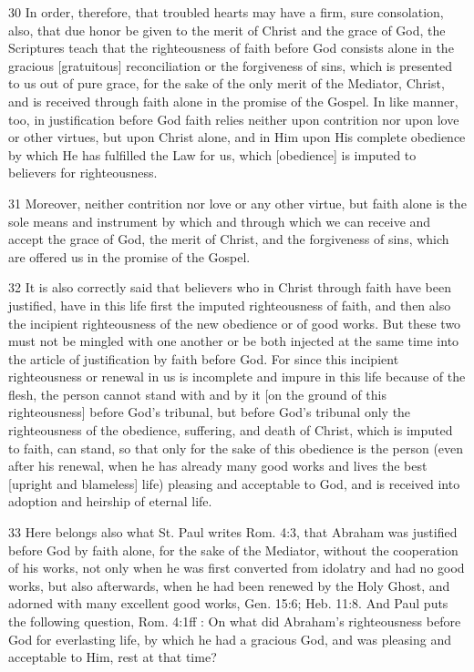 30 In order, therefore, that troubled hearts may have a firm, sure consolation, also, that due honor be given to the merit of Christ and the grace of God, the Scriptures teach that the righteousness of faith before God consists alone in the gracious [gratuitous] reconciliation or the forgiveness of sins, which is presented to us out of pure grace, for the sake of the only merit of the Mediator, Christ, and is received through faith alone in the promise of the Gospel. In like manner, too, in justification before God faith relies neither upon contrition nor upon love or other virtues, but upon Christ alone, and in Him upon His complete obedience by which He has fulfilled the Law for us, which [obedience] is imputed to believers for righteousness.

31 Moreover, neither contrition nor love or any other virtue, but faith alone is the sole means and instrument by which and through which we can receive and accept the grace of God, the merit of Christ, and the forgiveness of sins, which are offered us in the promise of the Gospel.

32 It is also correctly said that believers who in Christ through faith have been justified, have in this life first the imputed righteousness of faith, and then also the incipient righteousness of the new obedience or of good works. But these two must not be mingled with one another or be both injected at the same time into the article of justification by faith before God. For since this incipient righteousness or renewal in us is incomplete and impure in this life because of the flesh, the person cannot stand with and by it [on the ground of this righteousness] before God’s tribunal, but before God’s tribunal only the righteousness of the obedience, suffering, and death of Christ, which is imputed to faith, can stand, so that only for the sake of this obedience is the person (even after his renewal, when he has already many good works and lives the best [upright and blameless] life) pleasing and acceptable to God, and is received into adoption and heirship of eternal life.

33 Here belongs also what St. Paul writes Rom. 4:3, that Abraham was justified before God by faith alone, for the sake of the Mediator, without the cooperation of his works, not only when he was first converted from idolatry and had no good works, but also afterwards, when he had been renewed by the Holy Ghost, and adorned with many excellent good works, Gen. 15:6; Heb. 11:8. And Paul puts the following question, Rom. 4:1ff : On what did Abraham’s righteousness before God for everlasting life, by which he had a gracious God, and was pleasing and acceptable to Him, rest at that time?

